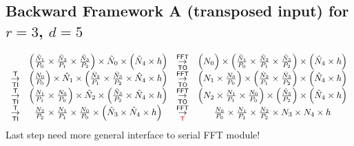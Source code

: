 \subsection{Backward Framework A (transposed input) for \texorpdfstring{$r=3$, $d=5$}{r=3 and d=5}}
\setlength{\arraycolsep}{2pt}
\begin{equation*}
  \begin{array}{cccc}
    & \left(\frac{\hat N_1}{P_0} \times \frac{\hat N_2}{P_1} \times \frac{\hat N_3}{P_2}\right) \times \hat N_0 \times \left(\hat N_4 \times h\right)
    & \overset{\textsf{FFT}}{\underset{\textsf{TO}}{\rightarrow}} & \Big(N_0\Big) \times \left(\frac{\hat N_1}{P_0} \times \frac{\hat N_2}{P_1} \times \frac{\hat N_3}{P_2}\right) \times \left(\hat N_4 \times h\right) \\
    \overset{\textsf{T}}{\underset{\textsf{TI}}{\rightarrow}} & \left(\frac{N_0}{P_0}\right) \times \hat N_1 \times \left(\frac{\hat N_2}{P_1} \times \frac{\hat N_3}{P_2} \times \hat N_4 \times h\right)
    & \overset{\textsf{FFT}}{\underset{\textsf{TO}}{\rightarrow}} & \left(N_1 \times \frac{N_0}{P_0}\right) \times \left(\frac{\hat N_2}{P_1} \times \frac{\hat N_3}{P_2} \right) \times \left(\hat N_4 \times h\right) \\
    \overset{\textsf{T}}{\underset{\textsf{TI}}{\rightarrow}} & \left(\frac{N_1}{P_1} \times \frac{N_0}{P_0}\right) \times \hat N_2 \times \left(\frac{\hat N_3}{P_2} \times \hat N_4 \times h \right)
    & \overset{\textsf{FFT}}{\underset{\textsf{TO}}{\rightarrow}} & \left(N_2 \times \frac{N_1}{P_1} \times \frac{N_0}{P_0}\right) \times \left(\frac{\hat N_3}{P_2} \right) \times \left(\hat N_4 \times h\right) \\
    \overset{\textsf{T}}{\underset{\textsf{TI}}{\rightarrow}} & \frac{N_2}{P_2} \times \frac{N_1}{P_1} \times \frac{N_0}{P_0} \times \left(\hat N_3 \times \hat N_4 \times h \right)
    & \overset{\textsf{FFT}}{\underset{\textsf{\textcolor{red}{T}}}{\rightarrow}} & \frac{N_0}{P_0} \times \frac{N_1}{P_1} \times \frac{N_2}{P_2} \times N_3 \times N_4 \times h
  \end{array}
\end{equation*}
Last step need more general interface to serial FFT module!

